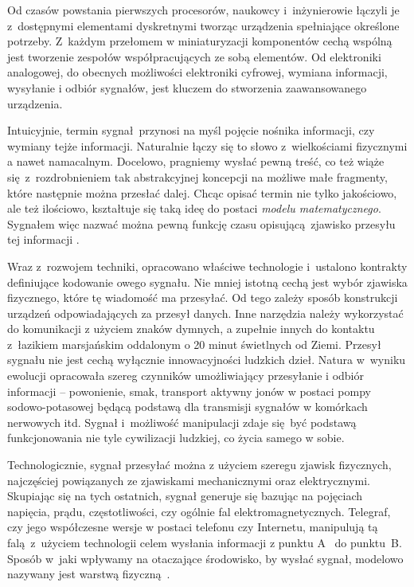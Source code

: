Od czasów powstania pierwszych procesorów, naukowcy i~inżynierowie łączyli
je z~dostępnymi elementami dyskretnymi tworząc urządzenia spełniające
określone potrzeby. Z~każdym przełomem w miniaturyzacji komponentów
cechą wspólną jest tworzenie zespołów współpracujących ze sobą elementów.
Od elektroniki analogowej, do obecnych możliwości elektroniki cyfrowej,
wymiana informacji, wysyłanie i odbiór sygnałów, jest kluczem do 
stworzenia zaawansowanego urządzenia.

Intuicyjnie, termin sygnał przynosi na myśl pojęcie nośnika informacji, czy wymiany tejże informacji.
Naturalnie łączy się to słowo z~wielkościami fizycznymi a nawet namacalnym. Docelowo, pragniemy wysłać
pewną treść, co też wiąże się z~rozdrobnieniem tak abstrakcyjnej koncepcji na możliwe małe fragmenty,
które następnie można przesłać dalej. Chcąc opisać termin nie tylko jakościowo, ale też ilościowo,
kształtuje się taką ideę do postaci \textit{modelu matematycznego}. Sygnałem więc nazwać można pewną funkcję
czasu opisującą zjawisko przesyłu tej informacji \cite{szabatin_podstawy_2007}.

Wraz z~rozwojem techniki, opracowano właściwe technologie i~ustalono kontrakty definiujące kodowanie
owego sygnału. Nie mniej istotną cechą jest wybór zjawiska fizycznego, które tę wiadomość ma przesyłać.
Od tego zależy sposób konstrukcji urządzeń odpowiadających za przesył danych. Inne narzędzia
należy wykorzystać do komunikacji z użyciem znaków dymnych, a zupełnie innych do kontaktu
z~łazikiem marsjańskim oddalonym o 20 minut świetlnych od Ziemi. Przesył sygnału nie jest cechą
wyłącznie innowacyjności ludzkich dzieł. Natura w~wyniku ewolucji opracowała szereg
czynników umożliwiający przesyłanie i odbiór informacji -- powonienie, smak, transport aktywny jonów
w postaci pompy sodowo-potasowej będącą podstawą dla transmisji sygnałów w komórkach nerwowych itd.
Sygnał i~możliwość manipulacji zdaje się być podstawą funkcjonowania nie tyle cywilizacji ludzkiej,
co życia samego w sobie.

Technologicznie, sygnał przesyłać można z użyciem szeregu zjawisk fizycznych, najczęściej powiązanych 
ze zjawiskami mechanicznymi oraz elektrycznymi. Skupiając się na tych ostatnich, sygnał generuje się
bazując na pojęciach napięcia, prądu, częstotliwości, czy ogólnie fal elektromagnetycznych.
Telegraf, czy jego współczesne wersje w postaci telefonu czy Internetu, manipulują tą falą z~użyciem
technologii celem wysłania informacji z punktu A~ do punktu~B. Sposób w~jaki wpływamy
na otaczające środowisko, by wysłać sygnał, modelowo nazywany jest warstwą fizyczną~\cite{sa_tcpip_nodate}.

